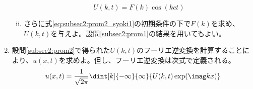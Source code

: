 \documentclass[dvipdfmx,titlepage, 11pt, a4paper]{jsarticle}%
\begin{document}
\begin{enumerate}[(1)]
\begin{enumerate}[(i)]
\begin{equation*}
            U(k, t) = F(k)\cos(kct)
        \end{equation*}
        \item さらに式\eqref{eq:subsec2:prom2_syoki1}の初期条件の下で$F(k)$を求め、$U(k, t)$を与えよ。設問\eqref{subsec2:prom1}の結果を用いてもよい。\label{subsec2:prom2:prom3}
    \end{enumerate}
    \item 設問\ref{subsec2:prom2}で得られた$U(k, t)$のフーリエ逆変換を計算することにより、$u(x, t)$を求めよ。但し、フーリエ逆変換は次式で定義される。\label{subsec2:prom3}
    \begin{equation*}
        u(x, t) = \frac{1}{\sqrt{2\pi}}\dint[k]{-\infty}{\infty}{U(k, t)\exp(\imag kx)}
    \end{equation*}
\end{enumerate}

\newpage
\end{document}
